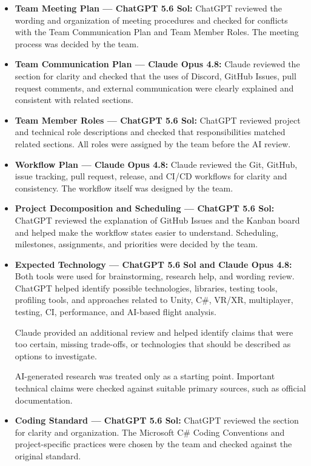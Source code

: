 \documentclass{article}
\begin{document}
\begin{itemize}

    \item \textbf{Team Meeting Plan --- ChatGPT 5.6 Sol:}
    ChatGPT reviewed the wording and organization of meeting procedures and checked for
    conflicts with the Team Communication Plan and Team Member Roles. The meeting process
    was decided by the team.

    \item \textbf{Team Communication Plan --- Claude Opus 4.8:}
    Claude reviewed the section for clarity and checked that the uses of Discord, GitHub
    Issues, pull request comments, and external communication were clearly explained and
    consistent with related sections.

    \item \textbf{Team Member Roles --- ChatGPT 5.6 Sol:}
    ChatGPT reviewed project and technical role descriptions and checked that responsibilities
    matched related sections. All roles were assigned by the team before the AI review.

    \item \textbf{Workflow Plan --- Claude Opus 4.8:}
    Claude reviewed the Git, GitHub, issue tracking, pull request, release, and CI/CD
    workflows for clarity and consistency. The workflow itself was designed by the team.

    \item \textbf{Project Decomposition and Scheduling --- ChatGPT 5.6 Sol:}
    ChatGPT reviewed the explanation of GitHub Issues and the Kanban board and helped make
    the workflow states easier to understand. Scheduling, milestones, assignments, and
    priorities were decided by the team.

    \item \textbf{Expected Technology --- ChatGPT 5.6 Sol and Claude Opus 4.8:}
    Both tools were used for brainstorming, research help, and wording review. ChatGPT helped
    identify possible technologies, libraries, testing tools, profiling tools, and approaches
    related to Unity, C\#, VR/XR, multiplayer, testing, CI, performance, and AI-based flight
    analysis.

    Claude provided an additional review and helped identify claims that were too certain,
    missing trade-offs, or technologies that should be described as options to investigate.

    AI-generated research was treated only as a starting point. Important technical claims
    were checked against suitable primary sources, such as official documentation.

    \item \textbf{Coding Standard --- ChatGPT 5.6 Sol:}
    ChatGPT reviewed the section for clarity and organization. The Microsoft C\# Coding
    Conventions and project-specific practices were chosen by the team and checked against
    the original standard.

\end{itemize}
\end{document}
